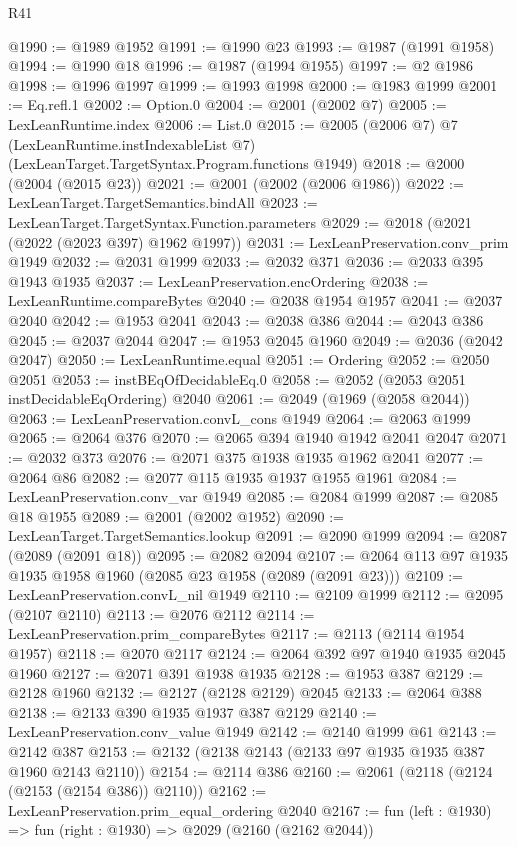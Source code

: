\begin{lexlean}{R41}
\begin{coremodule}
{{{{{{{{{{{{{{{{{{{{{{{{{{{{{{{{{{{{{{{{{{{{{{{{{{{{{{{{{{{{{{{{{{{{{{{{{{{{{{{{{{{{{{{@1990 := @1989 @1952
@1991 := @1990 @23
@1993 := @1987 (@1991 @1958)
@1994 := @1990 @18
@1996 := @1987 (@1994 @1955)
@1997 := @2 @1986
@1998 := @1996 @1997
@1999 := @1993 @1998
@2000 := @1983 @1999
@2001 := Eq.refl.{1}
@2002 := Option.{0}
@2004 := @2001 (@2002 @7)
@2005 := LexLeanRuntime.index
@2006 := List.{0}
@2015 := @2005
    (@2006 @7)
    @7
    (LexLeanRuntime.instIndexableList @7)
    (LexLeanTarget.TargetSyntax.Program.functions @1949)
@2018 := @2000 (@2004 (@2015 @23))
@2021 := @2001 (@2002 (@2006 @1986))
@2022 := LexLeanTarget.TargetSemantics.bindAll
@2023 := LexLeanTarget.TargetSyntax.Function.parameters
@2029 := @2018 (@2021 (@2022 (@2023 @397) @1962 @1997))
@2031 := LexLeanPreservation.conv_prim @1949
@2032 := @2031 @1999
@2033 := @2032 @371
@2036 := @2033 @395 @1943 @1935
@2037 := LexLeanPreservation.encOrdering
@2038 := LexLeanRuntime.compareBytes
@2040 := @2038 @1954 @1957
@2041 := @2037 @2040
@2042 := @1953 @2041
@2043 := @2038 @386
@2044 := @2043 @386
@2045 := @2037 @2044
@2047 := @1953 @2045 @1960
@2049 := @2036 (@2042 @2047)
@2050 := LexLeanRuntime.equal
@2051 := Ordering
@2052 := @2050 @2051
@2053 := instBEqOfDecidableEq.{0}
@2058 := @2052 (@2053 @2051 instDecidableEqOrdering) @2040
@2061 := @2049 (@1969 (@2058 @2044))
@2063 := LexLeanPreservation.convL_cons @1949
@2064 := @2063 @1999
@2065 := @2064 @376
@2070 := @2065 @394 @1940 @1942 @2041 @2047
@2071 := @2032 @373
@2076 := @2071 @375 @1938 @1935 @1962 @2041
@2077 := @2064 @86
@2082 := @2077 @115 @1935 @1937 @1955 @1961
@2084 := LexLeanPreservation.conv_var @1949
@2085 := @2084 @1999
@2087 := @2085 @18 @1955
@2089 := @2001 (@2002 @1952)
@2090 := LexLeanTarget.TargetSemantics.lookup
@2091 := @2090 @1999
@2094 := @2087 (@2089 (@2091 @18))
@2095 := @2082 @2094
@2107 := @2064 @113 @97 @1935 @1935 @1958 @1960 (@2085 @23 @1958 (@2089 (@2091 @23)))
@2109 := LexLeanPreservation.convL_nil @1949
@2110 := @2109 @1999
@2112 := @2095 (@2107 @2110)
@2113 := @2076 @2112
@2114 := LexLeanPreservation.prim_compareBytes
@2117 := @2113 (@2114 @1954 @1957)
@2118 := @2070 @2117
@2124 := @2064 @392 @97 @1940 @1935 @2045 @1960
@2127 := @2071 @391 @1938 @1935
@2128 := @1953 @387
@2129 := @2128 @1960
@2132 := @2127 (@2128 @2129) @2045
@2133 := @2064 @388
@2138 := @2133 @390 @1935 @1937 @387 @2129
@2140 := LexLeanPreservation.conv_value @1949
@2142 := @2140 @1999 @61
@2143 := @2142 @387
@2153 := @2132 (@2138 @2143 (@2133 @97 @1935 @1935 @387 @1960 @2143 @2110))
@2154 := @2114 @386
@2160 := @2061 (@2118 (@2124 (@2153 (@2154 @386)) @2110))
@2162 := LexLeanPreservation.prim_equal_ordering @2040
@2167 := fun (left : @1930) => fun (right : @1930) => @2029 (@2160 (@2162 @2044))
}}}}}}}}}}}}}}}}}}}}}}}}}}}}}}}}}}}}}}}}}}}}}}}}}}}}}}}}}}}}}}}}}}}}}}}}}}}}}}}}}}}}}}}
\end{coremodule}
\end{lexlean}
